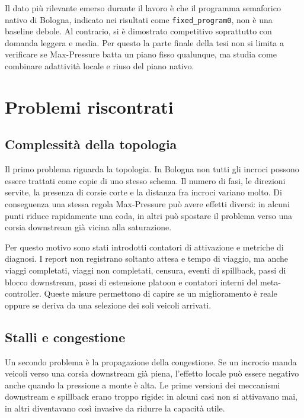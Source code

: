 \documentclass[12pt,a4paper,oneside]{report}
\numberwithin{equation}{chapter}
\begin{document}
Il dato più rilevante emerso durante il lavoro è che il programma semaforico
nativo di Bologna, indicato nei risultati come \texttt{fixed\_program0}, non è
una baseline debole. Al contrario, si è dimostrato competitivo soprattutto con
domanda leggera e media. Per questo la parte finale della tesi non si limita a
verificare se Max-Pressure batta un piano fisso qualunque, ma studia come
combinare adattività locale e riuso del piano nativo.

\section{Problemi riscontrati}

\subsection{Complessità della topologia}

Il primo problema riguarda la topologia. In Bologna non tutti gli incroci
possono essere trattati come copie di uno stesso schema. Il numero di fasi, le
direzioni servite, la presenza di corsie corte e la distanza fra incroci
variano molto. Di conseguenza una stessa regola Max-Pressure può avere effetti
diversi: in alcuni punti riduce rapidamente una coda, in altri può spostare il
problema verso una corsia downstream già vicina alla saturazione.

Per questo motivo sono stati introdotti contatori di attivazione e metriche di
diagnosi. I report non registrano soltanto attesa e tempo di viaggio, ma anche
viaggi completati, viaggi non completati, censura, eventi di spillback, passi di
blocco downstream, passi di estensione platoon e contatori interni del
meta-controller. Queste misure permettono di capire se un miglioramento è reale
oppure se deriva da una selezione dei soli veicoli arrivati.

\subsection{Stalli e congestione}

Un secondo problema è la propagazione della congestione. Se un incrocio manda
veicoli verso una corsia downstream già piena, l'effetto locale può essere
negativo anche quando la pressione a monte è alta. Le prime versioni dei
meccanismi downstream e spillback erano troppo rigide: in alcuni casi non si
attivavano mai, in altri diventavano così invasive da ridurre la capacità utile.
\end{document}
